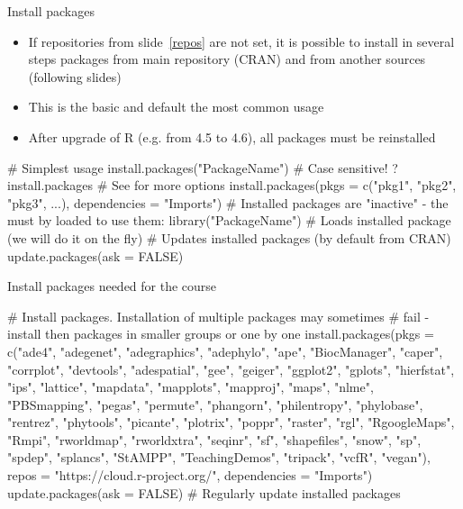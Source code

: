 \documentclass[compress, xelatex, 11pt, xcolor=svgnames, aspectratio=169, url={hyphens, lowtilde}]{beamer}
\begin{document}
\begin{frame}[fragile]{Install packages}
	\begin{itemize}
		\item If repositories from slide~\ref{repos} are not set, it is possible to install in several steps packages from main repository (CRAN) and from another sources (following slides)
		\item This is the basic and default the most common usage
		\item After upgrade of R (e.g. from 4.5 to 4.6), all packages must be reinstalled
	\end{itemize}
	\begin{spluscode}
    # Simplest usage
    install.packages("PackageName") # Case sensitive!
    ?install.packages # See for more options
    install.packages(pkgs = c("pkg1", "pkg2", "pkg3", ...),
      dependencies = "Imports")
    # Installed packages are "inactive" - the must by loaded to use them:
    library("PackageName") # Loads installed package (we will do it on the fly)
    # Updates installed packages (by default from CRAN)
    update.packages(ask = FALSE)
	\end{spluscode}
\end{frame}

\begin{frame}[fragile]{Install packages needed for the course}
	\begin{spluscode}
    # Install packages. Installation of multiple packages may sometimes
    # fail - install then packages in smaller groups or one by one
    install.packages(pkgs = c("ade4", "adegenet", "adegraphics", "adephylo",
      "ape", "BiocManager", "caper", "corrplot", "devtools", "adespatial",
      "gee", "geiger", "ggplot2", "gplots", "hierfstat", "ips",
      "lattice", "mapdata", "mapplots", "mapproj", "maps", "nlme",
      "PBSmapping", "pegas", "permute", "phangorn", "philentropy",
      "phylobase", "rentrez", "phytools", "picante", "plotrix", "poppr",
      "raster", "rgl", "RgoogleMaps", "Rmpi", "rworldmap", "rworldxtra",
      "seqinr", "sf", "shapefiles", "snow", "sp", "spdep", "splancs",
      "StAMPP", "TeachingDemos", "tripack", "vcfR", "vegan"),
      repos = "https://cloud.r-project.org/", dependencies = "Imports")
    update.packages(ask = FALSE) # Regularly update installed packages
	\end{spluscode}
\end{frame}
\end{document}
